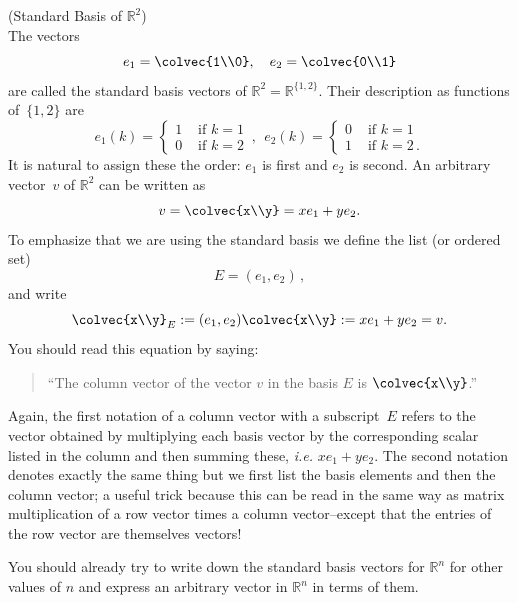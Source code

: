 \begin{example} (Standard Basis of $\mathbb{R}^2$)\\
The vectors 
\[
e_1=\colvec{1\\0},~~~
e_2=\colvec{0\\1}
\]
are called the standard basis vectors of $\mathbb{R}^2=\mathbb{R}^{\{1,2\}}$. 
Their description as functions of~$\{1,2\}$ are 
\begin{displaymath}
   e_1 (k)= \left\{
     \begin{array}{lr}
       1 & \text{~if~} k=1\\
       0 & \text{~if~} k=2
     \end{array}
   \right. \, ,~~
   e_2 (k)= \left\{
     \begin{array}{ll}
       0 & \text{~if~} k=1\\
       1 & \text{~if~} k=2\, .
     \end{array}
   \right.
\end{displaymath} 
It is  natural to assign these  the order: $e_1$ is first and $e_2$ is second.
An arbitrary vector~$v$ of $\mathbb{R}^2$ can be written as  
\[
v=\colvec{x\\y}=x e_1+ ye_2 .
\]
To emphasize that we are using the standard basis we define the list (or ordered set) \[E=(e_1,e_2)\, ,\] and write 
\[
\colvec{x\\y}_E:=(e_1,e_2)\colvec{x\\y}:=x e_1+ ye_2=v .
\]
You should read this equation by saying:
\begin{quote}
``The column vector of the vector $v$ in the basis $E$ is $\colvec{x\\y}$.''
\end{quote}

Again, the first notation of a column vector with a subscript~$E$ refers to the vector obtained by multiplying each basis vector
by the corresponding scalar listed in the column and then  summing these, {\itshape i.e.} $xe_1+y e_2$. 
The second notation denotes exactly the same thing but we first list the basis elements and then the column vector; a useful trick
because this can be read in the same way as matrix multiplication of a row vector times a column vector--except that the entries of the row vector are themselves vectors! 
\end{example}

You should already try to write down the standard basis vectors for $\mathbb{R}^n$ for other values of $n$ and express an arbitrary vector in $\mathbb{R}^n$  in terms of them.%

